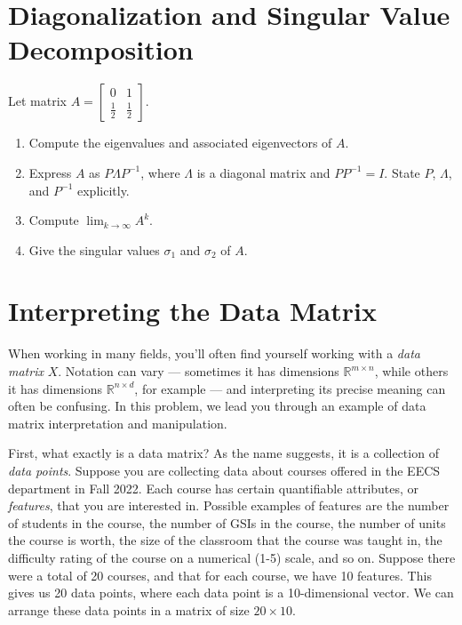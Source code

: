 \documentclass[10pt]{article}
\theoremstyle{definition}
\theoremstyle{plain}
\newcommand{\RR}{\mathbb{R}}
\begin{document}
\section{Diagonalization and Singular Value Decomposition}

Let matrix $A = \begin{bmatrix} 0 & 1 \\ \frac{1}{2} & \frac{1}{2} \end{bmatrix}$.

\begin{enumerate}[label=(\alph*)]
\item Compute the eigenvalues and associated eigenvectors of $A$.
\item Express $A$ as $P\Lambda P^{-1}$, where $\Lambda$ is a diagonal matrix and $PP^{-1} = I$. State $P$, $\Lambda$, and $P^{-1}$ explicitly.
\item Compute $\lim_{k\to\infty} A^k$.
\item Give the singular values $\sigma_1$ and $\sigma_2$ of $A$.
\end{enumerate}

\section{Interpreting the Data Matrix}

When working in many fields, you'll often find yourself working with a \textit{data matrix} $X$. Notation can vary --- sometimes it has dimensions $\RR^{m\times n}$, while others it has dimensions $\RR^{n\times d}$, for example --- and interpreting its precise meaning can often be confusing. In this problem, we lead you through an example of data matrix interpretation and manipulation.

First, what exactly is a data matrix? As the name suggests, it is a collection of \textit{data points}. Suppose you are collecting data about courses offered in the EECS department in Fall 2022. Each course has certain quantifiable attributes, or \textit{features}, that you are interested in. Possible examples of features are the number of students in the course, the number of GSIs in the course, the number of units the course is worth, the size of the classroom that the course was taught in, the difficulty rating of the course on a numerical (1-5) scale, and so on. Suppose there were a total of 20 courses, and that for each course, we have 10 features. This gives us 20 data points, where each data point is a 10-dimensional vector. We can arrange these data points in a matrix of size $20 \times 10$.
\end{document}
